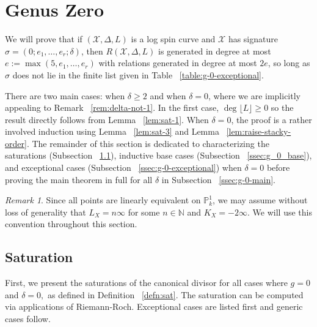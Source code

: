 \documentclass{amsart}
\theoremstyle{plain}
\theoremstyle{definition}
\theoremstyle{remark}
\newtheorem{rem}[thm]{Remark}
\numberwithin{equation}{section}
\newcommand\ssec{\subsection}
\newcommand\BN{{\mathbb N}}
\newcommand\BP{{\mathbb P}}
\newcommand \sx{\mathscr X}
\newcommand \halfcan{L}
\begin{document}

\section{Genus Zero}
\label{sec:g_0}
We will prove that if $(\sx , \Delta, \halfcan)$ is a log spin curve and
$\sx$ has signature $\sigma = (0; e_1, \ldots , e_r; \delta)$,
then $R(\sx , \Delta, L)$ is generated in degree at most $e := \max(
5, e_1, \ldots, e_r)$ with relations generated in degree at most $2e
$, so long as $\sigma$ does not lie in the finite list given in Table ~\ref{table:g-0-exceptional}.

There are two main cases: when $\delta \geq 2$ and when $\delta = 0$, where we are implicitly appealing to Remark ~\ref{rem:delta-not-1}. In the first case, $\deg \lfloor \halfcan \rfloor
\geq 0$ so the result directly follows from Lemma
~\ref{lem:sat-1}. When $\delta = 0$, the proof is a rather involved induction using Lemma
~\ref{lem:sat-3} and Lemma ~\ref{lem:raise-stacky-order}.
The remainder of this section is dedicated to characterizing the
saturations (Subsection ~\ref{ssec:g_0_saturation}), inductive
base cases (Subsection ~\ref{ssec:g_0_base}), and exceptional
cases (Subsection ~\ref{ssec:g-0-exceptional}) when $\delta = 0$
before proving the main theorem in full for all $\delta$ in
Subsection ~\ref{ssec:g-0-main}.

\begin{rem}
Since all points are linearly equivalent on $\BP^1_k$, we may assume without loss of generality that $L_X = n \infty$ for some $n \in \BN$ and $K_X = -2 \infty.$ We will use this convention throughout this section.
\end{rem}



\ssec{Saturation}
\label{ssec:g_0_saturation}
First, we present the saturations of the canonical divisor for
all cases where $g = 0$ and $\delta = 0,$ as defined in Definition
~\ref{defn:sat}. The saturation can be computed via applications
of Riemann-Roch. Exceptional cases are listed
first and generic cases follow.
\end{document}
